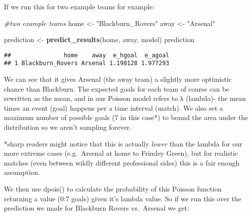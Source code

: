 \documentclass[
]{article}
\newenvironment{Shaded}{\begin{snugshade}}{\end{snugshade}}
\newcommand{\CommentTok}[1]{\textcolor[rgb]{0.56,0.35,0.01}{\textit{#1}}}
\newcommand{\KeywordTok}[1]{\textcolor[rgb]{0.13,0.29,0.53}{\textbf{#1}}}
\newcommand{\NormalTok}[1]{#1}
\newcommand{\StringTok}[1]{\textcolor[rgb]{0.31,0.60,0.02}{#1}}
\begin{document}
If we run this for two example teams for example:

\begin{Shaded}
\begin{Highlighting}[]
\CommentTok{#two example teams}
\NormalTok{home <-}\StringTok{ "Blackburn_Rovers"}
\NormalTok{away <-}\StringTok{ "Arsenal"}

\NormalTok{prediction <-}\StringTok{ }\KeywordTok{predict_results}\NormalTok{(home, away, model) }
\NormalTok{prediction}
\end{Highlighting}
\end{Shaded}

\begin{verbatim}
##               home    away  e_hgoal  e_agoal
## 1 Blackburn_Rovers Arsenal 1.198128 1.977293
\end{verbatim}

We can see that it gives Arsenal (the away team) a slightly more
optimistic chance than Blackburn. The expected goals for each team of
course can be rewritten as the mean, and in our Poisson model refers to
λ (lambda)- the mean times an event (goal) happens per a time interval
(match). We also set a maximum number of possible goals (7 in this
case*) to bound the area under the distribution so we aren't sampling
forever.

*sharp readers might notice that this is actually \emph{lower} than the
lambda for our more extreme cases (e.g.~Arsenal at home to Frimley
Green), but for realistic matches (even between wildly different
professional sides) this is a fair enough assumption.

We then use dpois() to calculate the probability of this Poisson
function returning a value (0:7 goals) given it's lambda value. So if we
run this over the prediction we made for Blackburn Rovers vs.~Arsenal we
get:
\end{document}
